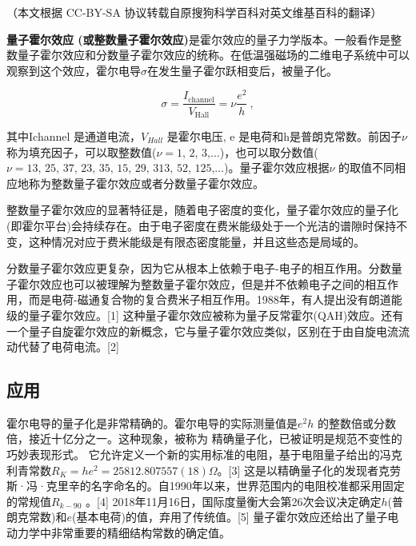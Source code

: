 
（本文根据 CC-BY-SA 协议转载自原搜狗科学百科对英文维基百科的翻译）

\textbf{量子霍尔效应 (或整数量子霍尔效应)}是霍尔效应的量子力学版本。一般看作是整数量子霍尔效应和分数量子霍尔效应的统称。在低温强磁场的二维电子系统中可以观察到这个效应，霍尔电导$\sigma$在发生量子霍尔跃相变后，被量子化。

\begin{equation}
\sigma = \frac{I_{\text{channel}}}{V_{\text{Hall}}} = \nu \frac{e^2}{h}~,
\end{equation}

其中Ichannel 是通道电流，$V_{Hall}$ 是霍尔电压, e 是电荷和h是普朗克常数。前因子$\nu$ 称为填充因子，可以取整数值($\nu =\text{1, 2, 3,…}$)，也可以取分数值( $\nu=\text{13, 25, 37, 23, 35, 15, 29, 313, 52, 125,…}$)。量子霍尔效应根据$\nu$ 的取值不同相应地称为整数量子霍尔效应或者分数量子霍尔效应。

整数量子霍尔效应的显著特征是，随着电子密度的变化，量子霍尔效应的量子化(即霍尔平台)会持续存在。由于电子密度在费米能级处于一个光洁的谱隙时保持不变，这种情况对应于费米能级是有限态密度能量，并且这些态是局域的。

分数量子霍尔效应更复杂，因为它从根本上依赖于电子-电子的相互作用。分数量子霍尔效应也可以被理解为整数量子霍尔效应，但是并不依赖电子之间的相互作用，而是电荷-磁通复合物的复合费米子相互作用。1988年，有人提出没有朗道能级的量子霍尔效应。[1] 这种量子霍尔效应被称为量子反常霍尔(QAH)效应。还有一个量子自旋霍尔效应的新概念，它与量子霍尔效应类似，区别在于由自旋电流流动代替了电荷电流。[2]

\subsection{应用}
霍尔电导的量子化是非常精确的。霍尔电导的实际测量值是$e^2h$ 的整数倍或分数倍，接近十亿分之一。这种现象，被称为 精确量子化，已被证明是规范不变性的巧妙表现形式。 它允许定义一个新的实用标准的电阻，基于电阻量子给出的冯克利青常数$R_K = he^2 = 25812.807557(18)\Omega$。[3] 这是以精确量子化的发现者克劳斯·冯·克里辛的名字命名的。自1990年以来，世界范围内的电阻校准都采用固定的常规值$R_{k-90}$ 。[4] 2018年11月16日，国际度量衡大会第26次会议决定确定$h$(普朗克常数)和$e$(基本电荷)的值，弃用了传统值。[5] 量子霍尔效应还给出了量子电动力学中非常重要的精细结构常数的确定值。

